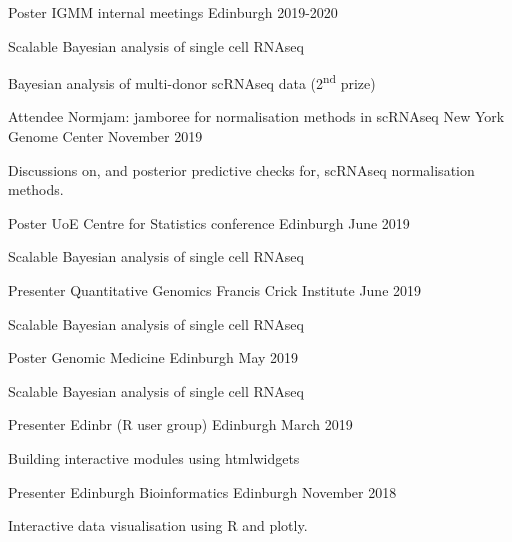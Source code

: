 
\begin{cventries}
  \cventry
  {Poster}
  {IGMM internal meetings}
  {Edinburgh}
  {2019-2020}
  {
    \begin{cvitems}
      \item 
        Scalable Bayesian analysis of single cell RNAseq
      \item 
        Bayesian analysis of multi-donor scRNAseq data (2\textsuperscript{nd} prize)
    \end{cvitems}
  }

  \cventry
  {Attendee}
  {Normjam: jamboree for normalisation methods in scRNAseq}
  {New York Genome Center}
  {November 2019}
  {
    \begin{cvitems}
      \item 
        Discussions on, and posterior predictive checks for,
        scRNAseq normalisation methods.
    \end{cvitems}
  }
  \cventry
  {Poster}
  {UoE Centre for Statistics conference}
  {Edinburgh}
  {June 2019}
  {
    \begin{cvitems}
      \item 
        Scalable Bayesian analysis of single cell RNAseq
    \end{cvitems}
  }

  \cventry
  {Presenter} %
  {Quantitative Genomics} %
  {Francis Crick Institute} %
  {June 2019} %
  { %
    \begin{cvitems}
      \item 
        Scalable Bayesian analysis of single cell RNAseq
    \end{cvitems}
  }
  \cventry
  {Poster}
  {Genomic Medicine}
  {Edinburgh}
  {May 2019}
  {
    \begin{cvitems}
      \item 
        Scalable Bayesian analysis of single cell RNAseq
    \end{cvitems}
  }


  \cventry
  {Presenter} %
  {Edinbr (R user group)} %
  {Edinburgh} %
  {March 2019} %
  { %
    \begin{cvitems}
      \item 
        Building interactive modules using htmlwidgets
    \end{cvitems}
  }

  \cventry
  {Presenter} %
  {Edinburgh Bioinformatics} %
  {Edinburgh} %
  {November 2018} %
  { %
    \begin{cvitems}
      \item 
        Interactive data visualisation using R and plotly.
    \end{cvitems}
  }


\end{cventries}

